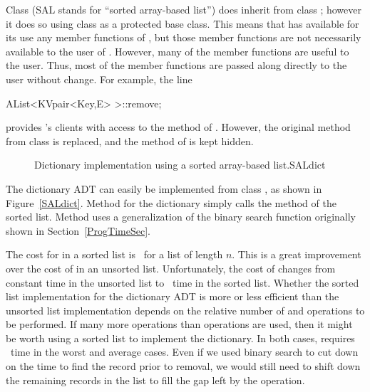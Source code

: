 {Class  (SAL stands for ``sorted array-based list'')
does inherit from class ; however it
does so using class  as a protected base
class.
This means that  has available for its use any member
functions of , but those member functions are not
necessarily available to the user of .
However, many of the  member functions are useful to the
 user.
Thus, most of the  member functions are passed along
directly to the  user without change.
For example, the line

\newpage

\begin{progenv}
AList<KVpair<Key,E> >::remove;
\end{progenv}

\noindent provides 's clients with access to the
 method of .
However, the original  method from class 
is replaced, and the  method of  is kept
hidden.

\begin{figure}
\vspace{-\bigskipamount}
{Dictionary implementation using a sorted array-based list.}{SALdict}
\end{figure}

\begin{figure}
\captcont
\end{figure}

The dictionary ADT can easily be implemented from class ,
as shown in Figure~\ref{SALdict}.
Method  for the dictionary simply calls the 
method of the sorted list.
Method  uses a generalization of the binary search
function originally shown in Section~\ref{ProgTimeSec}.}{}
The cost for  in a sorted list is \Thetalogn\ for a list of
length \(n\).
This is a great improvement over the cost of  in an
unsorted list.
Unfortunately, the cost of  changes from constant time in 
the unsorted list to \Thetan\ time in the sorted list.
Whether the sorted list implementation for the dictionary ADT is more
or less efficient than the unsorted list implementation depends on the
relative number of
 and  operations to be performed.
If many more  operations than  operations are
used, then it might be worth using a sorted list to implement the
dictionary.
In both cases,  requires \Thetan\ time in the worst and
average cases.
Even if we used binary search to cut down on the time to find the
record prior to removal, we would still need to shift down the
remaining records in the list to fill the gap left by the
 operation.

